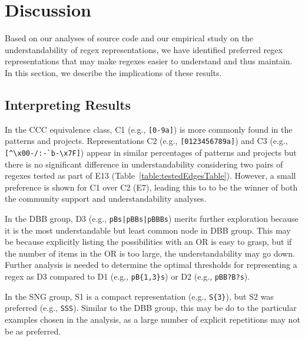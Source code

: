 \section{Discussion}
\label{sec:discussion}
Based on our analyses of source code and our empirical study on the understandability of regex representations, we have identified preferred regex representations that may make regexes easier to understand and thus maintain. In this section, we describe the implications of these results.

\subsection{Interpreting Results}
In the CCC equivalence class, C1 (e.g., \verb![0-9a]!) is more commonly found in the patterns and projects.  Representations C2 (e.g., \verb![0123456789a]!) and C3 (e.g., \verb![^\x00-/:-`b-\x7F]!) appear in similar percentages of patterns and projects but there is no significant difference in understandability considering two pairs of regexes tested as part of E13 (Table~\ref{table:testedEdgesTable}). However, a small preference is shown for C1 over C2 (E7), leading this to to be the winner of both the community support and understandability analyses.


In the DBB group, D3 (e.g., \verb!pBs|pBBs|pBBBs!) merits further exploration because it is the most understandable but least common node in DBB group.  This may be because explicitly listing the possibilities with an OR is easy to grasp, but if the number of items in the OR is too large, the understandability may go down. Further analysis is needed to determine the optimal thresholds for representing a regex as D3 compared to D1 (e.g., \verb!pB{1,3}s!) or D2 (e.g., \verb!pBB?B?s!).

In the SNG group, S1 is a compact representation (e.g., \verb!S{3}!), but S2 was preferred (e.g., \verb!SSS!). Similar to the DBB group, this may be do to the particular examples chosen in the analysis, as a large number of explicit repetitions may not be as preferred.

